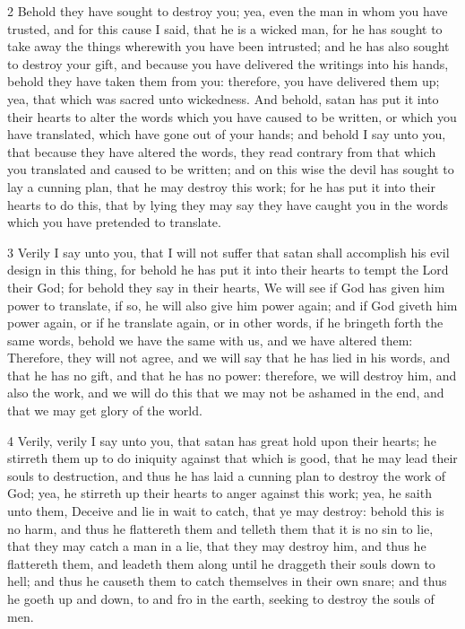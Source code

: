				2 Behold they have sought to destroy you; yea, even the man in whom you have trusted, and for this cause I said, that he is a wicked man, for he has sought to take away the things wherewith you have been intrusted; and he has also sought to destroy your gift, and because you have delivered the writings into his hands, behold they have taken them from you: therefore, you have delivered them up; yea, that which was sacred unto wickedness. And behold, satan has put it into their hearts to alter the words which you have caused to be written, or which you have translated, which have gone out of your hands; and behold I say unto you, that because they have altered the words, they read contrary from that which you translated and caused to be written; and on this wise the devil has sought to lay a cunning plan, that he may destroy this work; for he has put it into their hearts to do this, that by lying they may say they have caught you in the words which you have pretended to translate.

				3 Verily I say unto you, that I will not suffer that satan shall accomplish his evil design in this thing, for behold he has put it into their hearts to tempt the Lord their God; for behold they say in their hearts, We will see if God has given him power to translate, if so, he will also give him power again; and if God giveth him power again, or if he translate again, or in other words, if he bringeth forth the same words, behold we have the same with us, and we have altered them: Therefore, they will not agree, and we will say that he has lied in his words, and that he has no gift, and that he has no power: therefore, we will destroy him, and also the work, and we will do this that we may not be ashamed in the end, and that we may get glory of the world.

				4 Verily, verily I say unto you, that satan has great hold upon their hearts; he stirreth them up to do iniquity against that which is good, that he may lead their souls to destruction, and thus he has laid a cunning plan to destroy the work of God; yea, he stirreth up their hearts to anger against this work; yea, he saith unto them, Deceive and lie in wait to catch, that ye may destroy: behold this is no harm, and thus he flattereth them and telleth them that it is no sin to lie, that they may catch a man in a lie, that they may destroy him, and thus he flattereth them, and leadeth them along until he draggeth their souls down to hell; and thus he causeth them to catch themselves in their own snare; and thus he goeth up and down, to and fro in the earth, seeking to destroy the souls of men.

